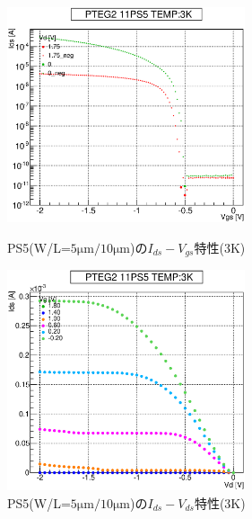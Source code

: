 				\begin{figure}[htbp]
					\begin{minipage}{0.5\hsize}
						\begin{center}
							\includegraphics[width=70mm]{./Chapter/Appendix/Picture/PST/PS5/PTEG2_11_PS5_IdVg_3K.eps}
						\end{center}
						\caption{PS5(W/L=$5\mathrm{\mu m}/10\mathrm{\mu m}$)の$I_{ds}-V_{gs}$特性(3K)}
						\label{fig:PS5_IdVg_3K}
					\end{minipage}
					\begin{minipage}{0.5\hsize}
						\begin{center}
							\includegraphics[width=70mm]{./Chapter/Appendix/Picture/PST/PS5/PTEG2_11_PS5_IdVd_3K.eps}
						\end{center}
						\caption{PS5(W/L=$5\mathrm{\mu m}/10\mathrm{\mu m}$)の$I_{ds}-V_{ds}$特性(3K)}
						\label{fig:PS5_IdVd_3K}
					\end{minipage}
				\end{figure}
